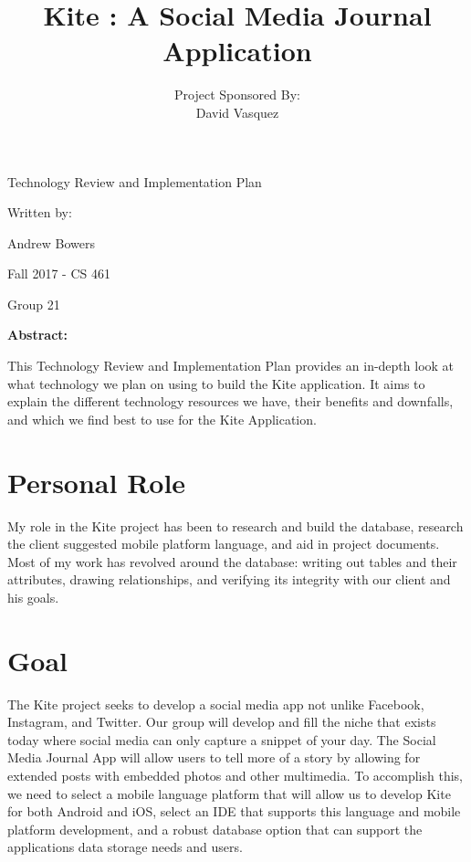 \documentclass[compsoc, 10, draftclsnofoot, onecolumn]{IEEEtran}
\date{}
\title{Kite : A Social Media Journal Application}
\author{ %
	Project Sponsored By: \\
    David Vasquez
}
\begin{document}
\null  %
\nointerlineskip  %
\vfill
\let\snewpage \newpage
\let\newpage \relax
\maketitle
\begin{center}
\huge{Technology Review and Implementation Plan}\par
\vspace{2mm}
\large{Written by:}\par
\normalsize{Andrew Bowers}\par
\vspace{2mm}
\normalsize{Fall 2017 - CS 461}\par
\vspace{4mm}
\large{Group 21}\par
\vspace{8mm}
\large{\textbf{Abstract:}}\par 
\vspace{2mm}
\normalsize{This Technology Review and Implementation Plan provides an in-depth look at what technology we plan on using to build the Kite application. It aims to explain the different technology resources we have, their benefits and downfalls, and which we find best to use for the Kite Application.}
\end{center}
\let \newpage \snewpage
\vfill 
\break %

\section*{\textbf{Personal Role}} My role in the Kite project has been to research and build the database, research the client suggested mobile platform language, and aid in project documents. Most of my work has revolved around the database: writing out tables and their attributes, drawing relationships, and verifying its integrity with our client and his goals.   

\section*{\textbf{Goal}} The Kite project seeks to develop a social media app not unlike Facebook, Instagram, and Twitter. Our group will develop and fill the niche that exists today where social media can only capture a snippet of your day. The Social Media Journal App will allow users to tell more of a story by allowing for extended posts with embedded photos and other multimedia. To accomplish this, we need to select a mobile language platform that will allow us to develop Kite for both Android and iOS, select an IDE that supports this language and mobile platform development, and a robust database option that can support the applications data storage needs and users. 
\end{document}
